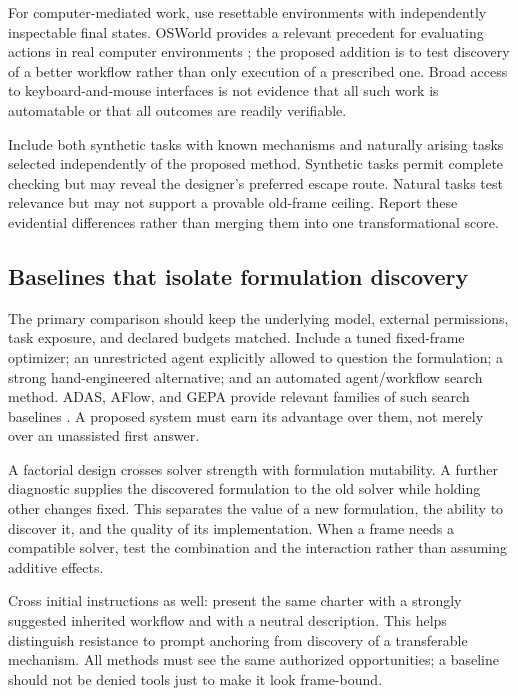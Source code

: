 \documentclass[11pt,letterpaper]{article}
\theoremstyle{remark}\newtheorem{remark}{Remark}[section]
\begin{document}
For computer-mediated work, use resettable environments with independently inspectable final states. OSWorld provides a relevant precedent for evaluating actions in real computer environments \citep{xie2024osworld}; the proposed addition is to test discovery of a better workflow rather than only execution of a prescribed one. Broad access to keyboard-and-mouse interfaces is not evidence that all such work is automatable or that all outcomes are readily verifiable.

Include both synthetic tasks with known mechanisms and naturally arising tasks selected independently of the proposed method. Synthetic tasks permit complete checking but may reveal the designer's preferred escape route. Natural tasks test relevance but may not support a provable old-frame ceiling. Report these evidential differences rather than merging them into one transformational score.

\subsection{Baselines that isolate formulation discovery}
The primary comparison should keep the underlying model, external permissions, task exposure, and declared budgets matched. Include a tuned fixed-frame optimizer; an unrestricted agent explicitly allowed to question the formulation; a strong hand-engineered alternative; and an automated agent/workflow search method. ADAS, AFlow, and GEPA provide relevant families of such search baselines \citep{hu2024adas,zhang2024aflow,agrawal2025gepa}. A proposed system must earn its advantage over them, not merely over an unassisted first answer.

A factorial design crosses solver strength with formulation mutability. A further diagnostic supplies the discovered formulation to the old solver while holding other changes fixed. This separates the value of a new formulation, the ability to discover it, and the quality of its implementation. When a frame needs a compatible solver, test the combination and the interaction rather than assuming additive effects.

Cross initial instructions as well: present the same charter with a strongly suggested inherited workflow and with a neutral description. This helps distinguish resistance to prompt anchoring from discovery of a transferable mechanism. All methods must see the same authorized opportunities; a baseline should not be denied tools just to make it look frame-bound.
\end{document}
